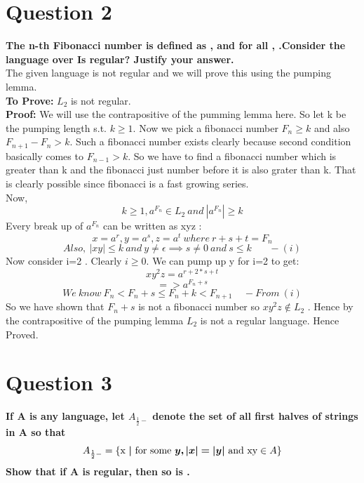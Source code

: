 \documentclass{article}
\begin{document}
\pagebreak


\section{Question 2}
\textbf{The n-th Fibonacci number is defined as , and for all ,  .Consider the language over  Is  regular? Justify your answer.}\\
\newline
The given language is not regular and we will prove this using the pumping lemma. \\
\textbf{To Prove:} $L_2$ is not regular.\\
\textbf{Proof:} We will use the contrapositive of the pumming lemma here. So let k be the pumping length s.t. $k\geq 1$. Now we pick a fibonacci number $F_n\geq k$ and also $F_{n+1}-F_{n}>k$. Such a fibonacci number exists clearly because second condition basically comes to $F_{n-1}>k$. So we have to find a fibonacci number which is greater than k and the fibonacci just number before it is also grater than k. That is clearly possible since fibonacci is a fast growing series.\\
Now,
\[ k\geq 1 , a^{F_n}\in L_2 \ and \ |a^{F_n}|\geq k\] 
Every break up of $a^{F_n}$ can be written as xyz :
\[x=a^r,y=a^s,z=a^t\ where \ r+s+t=F_n\] 
\[ Also, \ |xy|\leq k \ and \ y\neq \epsilon \implies  s\neq0 \ and \ s\leq k\ \ \ \ \ \ \ \  -(i)\]
Now consider i=2 . Clearly  $i\geq0$.
We can pump up y for i=2 to get:
\[xy^2z = a^{r+2*s+t}\] 
\[=> a^{F_n+s}\] 
\[We \ know \ F_n<F_n+s\leq F_n+k<F_{n+1} \ \ \ \ \ - From\ (i)\]
So we have shown that $F_n+s$ is not a fibonacci number so $xy^2z\notin L_2$ . Hence by the contrapositive of the pumping lemma $L_2$ is not a regular language. Hence Proved.

\pagebreak



\section{Question 3}
\textbf{If A is any language, let $A_{\frac{1}{2}-}$ denote the set of all first halves of strings in A so that \[ A_{\frac{1}{2}-} = \text{\{x \boldsymbol{$|$} for some \boldsymbol{$y,|x|=|y|$} and xy} \in A\} \] 
        Show that if A is regular, then so is .\\}
\end{document}
